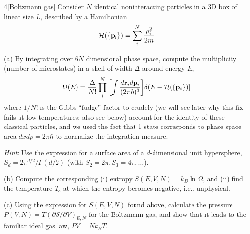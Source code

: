 \documentclass[12pt]{article}
\begin{document}
\begin{problem}{4}[Boltzmann gas]
Consider $N$ identical noninteracting particles in a 3D box of linear size $L$,
described by a Hamiltonian
\begin{equation}
    \mathcal{H}(\qty{\vb{p}_i})=\sum_i^N\frac{p_i^2}{2m}
\end{equation}

(a) By integrating over $6N$ dimensional phase space, compute the multiplicity
(number of microstates) in a shell of width $\Delta$ around energy $E$,
\begin{equation}
    \Omega(E)=\frac{\Delta}{N!}\prod_{i}^N\qty[\int\frac{d\vb{r}_id\vb{p}_i}{(2\pi\hbar)^3}]\delta(E-\mathcal{H}(\qty{\vb{p}_i})] 
\end{equation}
where $1/N!$ is the Gibbs ``fudge'' factor to crudely (we will see later why
this fix fails at low temperatures; also see below) account for the identity of
these classical particles, and we used the fact that 1 state corresponds to
phase space area $dxdp=2\pi\hbar$ to normalize the integration measure.

\textit{Hint}: Use the expression for a surface area of a $d$-dimensional unit
hypersphere, $S_d=2\pi^{d/2}/\Gamma(d/2)$ (with $S_2=2\pi,S_3=4\pi,\hdots$).

(b) Compute the corresponding (i) entropy $S(E,V,N)=k_B\ln\Omega$, and (ii) find
the temperature $T_c$ at which the entropy becomes negative, i.e., unphysical.

(c) Using the expression for $S(E,V,N)$ found above, calculate the pressure
$P(V,N)=T(\partial S/\partial V)_{E,N}$ for the Boltzmann gas, and show that it
leads to the familiar ideal gas law, $PV=Nk_BT$.


\end{problem}
\end{document}
